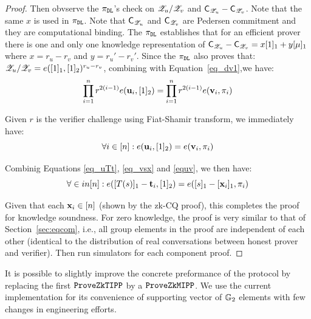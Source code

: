 \begin{proof}
Then obvserve the $\pi_{{\tt DL}}$'s check on
${\mathscr{Z}}_u/{\mathscr{Z}}_v$ and ${\mathsf{C}}_{{\mathscr{Z}}_u} - {\mathsf{C}}_{{\mathscr{Z}}_v}$.
Note that the same $x$ is used in $\pi_{{\tt DL}}$.
Note that ${\mathsf{C}}_{{\mathscr{Z}}_u}$ and ${\mathsf{C}}_{{\mathscr{Z}}_v}$ are
Pedersen commitment and they are computational binding.
The $\pi_{{\tt DL}}$ establishes that
for an efficient prover there is one and only one
knowledge representation
of ${\mathsf{C}}_{{\mathscr{Z}}_u} - {\mathsf{C}}_{{\mathscr{Z}}_v} = x[1]_1 + y[\mu]_1$
where $x = r_u - r_v$ and $y = r_u' - r_v'$.
Since the $\pi_{{\tt DL}}$ also proves that:
${\mathscr{Z}}_u/{\mathscr{Z}}_v = e([1]_1, [1]_2)^{r_u-r_v}$, combining
with Equation\ \ref{eq_dv1},we have:
\begin{equation}
\prod_{i=1}^n r^{2(i-1)} e({{\mathbf {u}}}_i, [1]_2) 
= \prod_{i=1}^n r^{2(i-1)} e({{\mathbf {v}}}_i, \pi_i) 
\end{equation}

Given $r$ is the verifier challenge using
Fiat-Shamir transform, we immediately have:
\begin{equation}
\forall i\in [n]: 
	e({{\mathbf {u}}}_i, [1]_2) = e({{\mathbf {v}}}_i, \pi_i) \label{equv}
\end{equation}

Combinig Equations \ref{eq_uTt}, \ref{eq_vsx} and \ref{equv}, we then
have:
\begin{equation}
\forall \in in [n]:	
	e([T(s)]_1 - {{\mathbf {t}}}_i, [1]_2) = e([s]_1 - [{{\mathbf {x}}}_i]_1, 
		\pi_i) \label{eq_final}
\end{equation}

Given that each ${{\mathbf {x}}}_i \in [n]$ (shown by the zk-CQ proof),
this completes the proof for knowledge soundness. For zero knowledge,
the proof is very similar to that of Section\ \ref{sec:eqcom}, i.e.,
all group elements in the proof are independent of each other (identical
to the distribution of real conversations between honest
prover and verifier). Then run simulators for each component
proof.
\end{proof}

It is possible to slightly improve the concrete preformance
of the protocol by replacing the first ${\mathtt{ProveZkTIPP}}$
by a ${\mathtt{ProveZkMIPP}}$. We use the current implementation for its
convenience of supporting vector of ${\mathbb{G}}_2$ elements with
few changes in engineering efforts.
